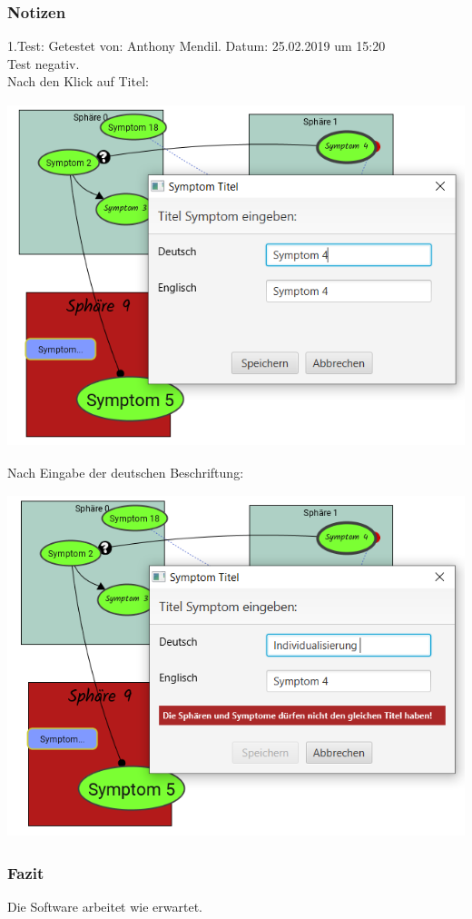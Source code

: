 \documentclass{scrartcl}
\begin{document}
\subsubsection{Notizen}
1.Test: Getestet von: Anthony Mendil. Datum: 25.02.2019 um 15:20 \\
Test negativ. \\
Nach den Klick auf Titel: 
\begin{center}
\includegraphics[height=10cm]{3_46vorher.PNG}
\end{center}
Nach Eingabe der deutschen Beschriftung:
\begin{center}
\includegraphics[height=10cm]{3_46nachher.PNG}
\end{center}
\subsubsection{Fazit}
Die Software arbeitet wie erwartet.
\end{document}
